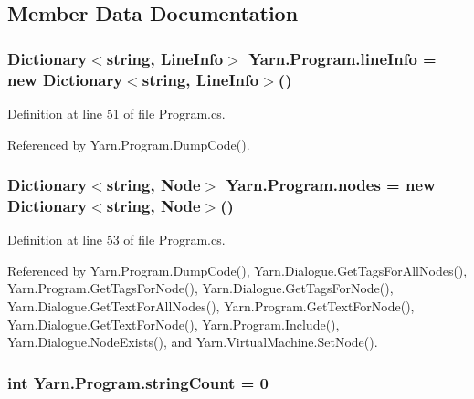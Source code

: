\subsection{Member Data Documentation}
\hypertarget{a00140_a0d4da395947767b4a1eaaff8a9842adc}{
\subsubsection[{line\-Info}]{\setlength{\rightskip}{0pt plus 5cm}Dictionary$<$string, {\bf Line\-Info}$>$ Yarn.\-Program.\-line\-Info = new Dictionary$<$string, {\bf Line\-Info}$>$()\hspace{0.3cm}{\ttfamily [package]}}}\label{a00140_a0d4da395947767b4a1eaaff8a9842adc}


Definition at line 51 of file Program.\-cs.



Referenced by Yarn.\-Program.\-Dump\-Code().

\hypertarget{a00140_a3f4928a577c88263ad016be259b175c4}{
\subsubsection[{nodes}]{\setlength{\rightskip}{0pt plus 5cm}Dictionary$<$string, {\bf Node}$>$ Yarn.\-Program.\-nodes = new Dictionary$<$string, {\bf Node}$>$()\hspace{0.3cm}{\ttfamily [package]}}}\label{a00140_a3f4928a577c88263ad016be259b175c4}


Definition at line 53 of file Program.\-cs.



Referenced by Yarn.\-Program.\-Dump\-Code(), Yarn.\-Dialogue.\-Get\-Tags\-For\-All\-Nodes(), Yarn.\-Program.\-Get\-Tags\-For\-Node(), Yarn.\-Dialogue.\-Get\-Tags\-For\-Node(), Yarn.\-Dialogue.\-Get\-Text\-For\-All\-Nodes(), Yarn.\-Program.\-Get\-Text\-For\-Node(), Yarn.\-Dialogue.\-Get\-Text\-For\-Node(), Yarn.\-Program.\-Include(), Yarn.\-Dialogue.\-Node\-Exists(), and Yarn.\-Virtual\-Machine.\-Set\-Node().

\hypertarget{a00140_a8ef1d10094ef00311aade6715ba78ec7}{
\subsubsection[{string\-Count}]{\setlength{\rightskip}{0pt plus 5cm}int Yarn.\-Program.\-string\-Count = 0\hspace{0.3cm}{\ttfamily [private]}}}\label{a00140_a8ef1d10094ef00311aade6715ba78ec7}


